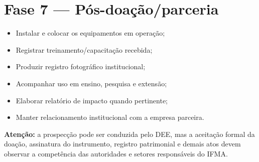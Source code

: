 \documentclass[11pt,a4paper]{article}
\begin{document}
\section{Fase 7 — Pós-doação/parceria}
\begin{itemize}[leftmargin=*]
\item[$\square$] Instalar e colocar os equipamentos em operação;
\item[$\square$] Registrar treinamento/capacitação recebida;
\item[$\square$] Produzir registro fotográfico institucional;
\item[$\square$] Acompanhar uso em ensino, pesquisa e extensão;
\item[$\square$] Elaborar relatório de impacto quando pertinente;
\item[$\square$] Manter relacionamento institucional com a empresa parceira.
\end{itemize}

\begin{destaque}
\textbf{Atenção:} a prospecção pode ser conduzida pelo DEE, mas a aceitação formal da doação, assinatura do instrumento, registro patrimonial e demais atos devem observar a competência das autoridades e setores responsáveis do IFMA.
\end{destaque}
\end{document}
